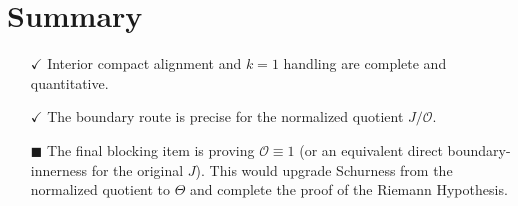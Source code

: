 \documentclass[11pt, a4paper]{article}
\begin{document}
\hrulefill

\section*{Summary}
\begin{itemize}
    \item[$\checkmark$] Interior compact alignment and $k=1$ handling are complete and quantitative.
    \item[$\checkmark$] The boundary route is precise for the normalized quotient $J/\mathcal{O}$.
    \item[$\blacksquare$] The final blocking item is proving $\mathcal{O} \equiv 1$ (or an equivalent direct boundary-innerness for the original $J$). This would upgrade Schurness from the normalized quotient to $\Theta$ and complete the proof of the Riemann Hypothesis.
\end{itemize}
\end{document}
